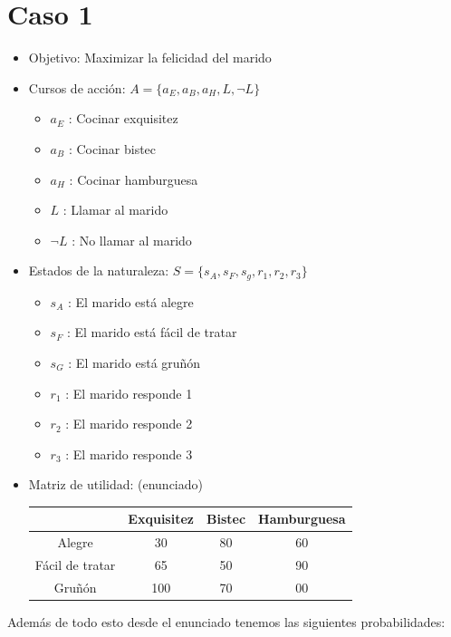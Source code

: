 \documentclass[11pt,letterpaper]{article}
\begin{document}
\section{Caso 1}
\begin{itemize}
    \item Objetivo: Maximizar la felicidad del marido
    \item Cursos de acción: $A=\{a_E, a_B, a_H, L, \neg L\}$
        \begin{itemize}
            \item $a_E$ : Cocinar exquisitez
            \item $a_B$ : Cocinar bistec
            \item $a_H$ : Cocinar hamburguesa
            \item $L$ : Llamar al marido
            \item $\neg L$ : No llamar al marido
        \end{itemize}
    \item Estados de la naturaleza: $S=\{s_A, s_F, s_g, r_1, r_2, r_3\}$
        \begin{itemize}
            \item $s_A$ : El marido está alegre
            \item $s_F$ : El marido está fácil de tratar
            \item $s_G$ : El marido está gruñón
            \item $r_1$ : El marido responde 1
            \item $r_2$ : El marido responde 2
            \item $r_3$ : El marido responde 3
        \end{itemize}
    \item Matriz de utilidad: (enunciado)
    \begin{table}[H]
        \centering
        \begin{tabular}{c|c|c|c}
                            & Exquisitez & Bistec & Hamburguesa \\\hline
            Alegre          & 30         & 80     & 60\\ \hline
            Fácil de tratar & 65         & 50     & 90\\ \hline
            Gruñón          & 100        & 70     & 00\\ \hline
        \end{tabular}
    \end{table}
\end{itemize}
Además de todo esto desde el enunciado tenemos las siguientes probabilidades:
\end{document}
